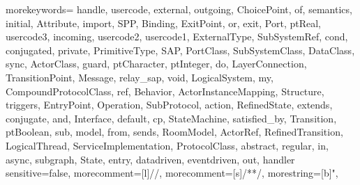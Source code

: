 


{morekeywords={
handle,
usercode,
external,
outgoing,
ChoicePoint,
of,
semantics,
initial,
Attribute,
import,
SPP,
Binding,
ExitPoint,
or,
exit,
Port,
ptReal,
usercode3,
incoming,
usercode2,
usercode1,
ExternalType,
SubSystemRef,
cond,
conjugated,
private,
PrimitiveType,
SAP,
PortClass,
SubSystemClass,
DataClass,
sync,
ActorClass,
guard,
ptCharacter,
ptInteger,
do,
LayerConnection,
TransitionPoint,
Message,
relay_sap,
void,
LogicalSystem,
my,
CompoundProtocolClass,
ref,
Behavior,
ActorInstanceMapping,
Structure,
triggers,
EntryPoint,
Operation,
SubProtocol,
action,
RefinedState,
extends,
conjugate,
and,
Interface,
default,
cp,
StateMachine,
satisfied_by,
Transition,
ptBoolean,
sub,
model,
from,
sends,
RoomModel,
ActorRef,
RefinedTransition,
LogicalThread,
ServiceImplementation,
ProtocolClass,
abstract,
regular,
in,
async,
subgraph,
State,
entry,
datadriven,
eventdriven,
out,
handler}
sensitive=false,
morecomment=[l]{//},
morecomment=[s]{/*}{*/},
morestring=[b]",
} 
